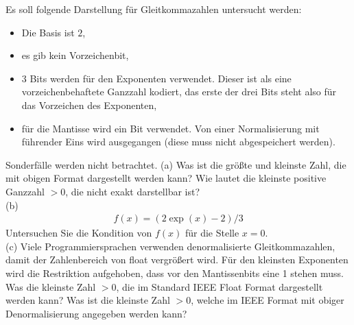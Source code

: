\documentclass{scrartcl}
\begin{document}
Es soll folgende Darstellung für Gleitkommazahlen untersucht werden:
\begin{itemize}
	\item Die Basis ist $2$,
	\item es gib kein Vorzeichenbit,
	\item $3$ Bits werden für den Exponenten verwendet. Dieser ist als eine vorzeichenbehaftete Ganzzahl kodiert, das erste der drei Bits steht also für das Vorzeichen des Exponenten,
	\item für die Mantisse wird ein Bit verwendet. Von einer Normalisierung mit führender Eins wird ausgegangen (diese muss nicht abgespeichert werden).
\end{itemize}Sonderfälle werden nicht betrachtet.
\lbreak
\n
(a) 
Was ist die größte und kleinste Zahl, die mit obigen Format dargestellt werden kann?
\n 
Wie lautet die kleinste positive Ganzzahl $>0$, die nicht exakt darstellbar ist?
\lbreak 
\\
(b) 
\begin{align*}
f(x) = (2\exp(x) - 2 ) / 3
\end{align*}
Untersuchen Sie die Kondition von $f(x)$ für die Stelle $x=0$.
\lbreak 
\\
(c) 
Viele Programmiersprachen verwenden denormalisierte Gleitkommazahlen, damit der Zahlenbereich von float vergrößert wird. Für den kleinsten Exponenten wird die Restriktion aufgehoben, dass vor den Mantissenbits eine 1 stehen muss.
\n 
Was die kleinste Zahl $>0$, die im Standard IEEE Float Format dargestellt werden kann?
\n 
Was ist die kleinste Zahl $>0$, welche im IEEE Format mit obiger Denormalisierung angegeben werden kann?
\end{document}
